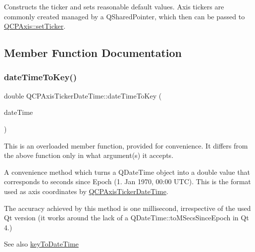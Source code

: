 Constructs the ticker and sets reasonable default values. Axis tickers are commonly created managed by a Q\+Shared\+Pointer, which then can be passed to \hyperlink{classQCPAxis_a4ee03fcd2c74d05cd1a419b9af5cfbdc}{Q\+C\+P\+Axis\+::set\+Ticker}. 

\subsection{Member Function Documentation}
\mbox{\label{classQCPAxisTickerDateTime_aa24f293f16fff0f937bf71f4140033f1}} 
\subsubsection{\texorpdfstring{date\+Time\+To\+Key()}{dateTimeToKey()}\hspace{0.1cm}{\footnotesize\ttfamily [1/2]}}
{\footnotesize\ttfamily double Q\+C\+P\+Axis\+Ticker\+Date\+Time\+::date\+Time\+To\+Key (\begin{DoxyParamCaption}\item[{const Q\+Date\+Time}]{date\+Time }\end{DoxyParamCaption})\hspace{0.3cm}{\ttfamily [static]}}

This is an overloaded member function, provided for convenience. It differs from the above function only in what argument(s) it accepts.

A convenience method which turns a Q\+Date\+Time object into a double value that corresponds to seconds since Epoch (1. Jan 1970, 00\+:00 U\+TC). This is the format used as axis coordinates by \hyperlink{classQCPAxisTickerDateTime}{Q\+C\+P\+Axis\+Ticker\+Date\+Time}.

The accuracy achieved by this method is one millisecond, irrespective of the used Qt version (it works around the lack of a Q\+Date\+Time\+::to\+M\+Secs\+Since\+Epoch in Qt 4.)

\begin{DoxySeeAlso}{See also}
\hyperlink{classQCPAxisTickerDateTime_a4c1761ad057f5564804a53f942629b53}{key\+To\+Date\+Time} 
\end{DoxySeeAlso}
\mbox{\label{classQCPAxisTickerDateTime_ad87afc7dba65843f68da5ca88bc004f4}} 
